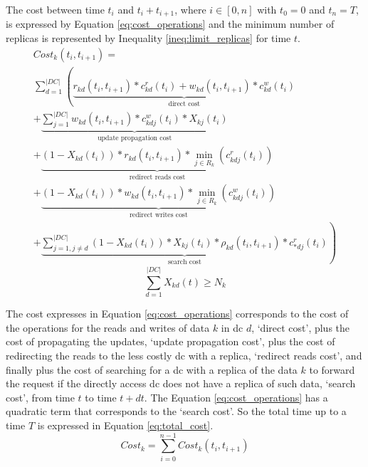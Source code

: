 \documentclass{acm_proc_article-sp}
\begin{document}
The cost between time $t_{i}$ and $t_{i}+t_{i+1}$, where $i \in [0, n]$ with $t_{0} = 0$ and $t_{n} = T$, is expressed by Equation \ref{eq:cost_operations} and the minimum number of replicas is represented by Inequality \ref{ineq:limit_replicas} for time $t$.
\begin{equation}\label{eq:cost_operations}
	\begin{split}
		 Cost_{k}(t_{i}, t_{i+1}) =\\
		  \sum^{|DC|}_{d = 1} \left(\underbrace{r_{kd}(t_{i}, t_{i+1}) * c^{r}_{kd}(t_{i}) + w_{kd}(t_{i}, t_{i+1}) * c^{w}_{kd}(t_{i})}_\text{direct cost} \right. \\
		 \left. + \underbrace{\sum^{|DC|}_{j = 1} w_{kd}(t_{i}, t_{i+1}) * c^{w}_{kdj}(t_{i}) * X_{kj}(t_{i})}_\text{update propagation cost} \right. \\ 
		 \left. + \underbrace{(1 - X_{kd}(t_{i})) * r_{kd}(t_{i}, t_{i+1}) * \min_{j \in R_{k}}(c^{r}_{kdj}(t_{i}))}_\text{redirect reads cost} \right. \\  
		 \left. + \underbrace{(1 - X_{kd}(t_{i})) * w_{kd}(t_{i}, t_{i+1}) * \min_{j \in R_{k}}(c^{w}_{kdj}(t_{i}))}_\text{redirect writes cost}  \right. \\ \left. + \underbrace{\sum^{|DC|}_{j = 1, j \neq d}  (1 - X_{kd}(t_{i})) * X_{kj}(t_{i}) * \rho_{kd}(t_{i}, t_{i+1})  * c^{r}_{*dj}(t_{i})}_\text{search cost}\right)
	 \end{split}
\end{equation}
\begin{equation} \label{ineq:limit_replicas}
	\sum^{|DC|}_{d = 1} X_{kd}(t) \ge N_{k}
\end{equation}

The cost expresses in Equation \ref{eq:cost_operations} corresponds to the cost of the operations for the reads and writes of data $k$ in \gls{dc} $d$, `direct cost', plus the cost of propagating the updates, `update propagation cost', plus the cost of redirecting the reads to the less costly \gls{dc} with a replica, `redirect reads cost', and finally plus the cost of searching for a \gls{dc} with a replica of the data $k$ to forward the request if the directly access \gls{dc} does not have a replica of such data, `search cost', from time $t$ to time $t+dt$. The Equation \ref{eq:cost_operations} has a quadratic term that corresponds to the `search cost'. So the total time up to a time $T$ is expressed in Equation \ref{eq:total_cost}.
\begin{equation} \label{eq:total_cost}
	Cost_{k} = \sum^{n-1}_{i=0} Cost_{k}(t_{i}, t_{i+1})
\end{equation}
\end{document}
